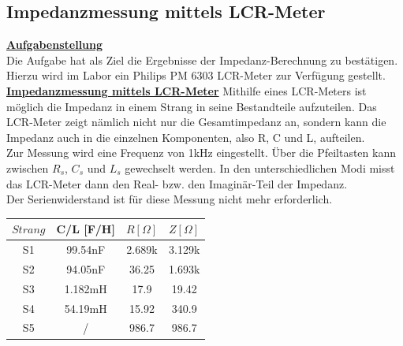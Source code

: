 \documentclass[a4paper,12pt]{article}
\begin{document}
	\subsection{Impedanzmessung mittels LCR-Meter}
	\underline{\textbf{Aufgabenstellung}} \\ \newline
	\noindent
	Die Aufgabe hat als Ziel die Ergebnisse der Impedanz-Berechnung zu bestätigen. Hierzu wird im Labor ein Philips PM 6303 LCR-Meter zur Verfügung gestellt. \\ \newline
	\noindent
	\underline{\textbf{Impedanzmessung mittels LCR-Meter}}
	Mithilfe eines LCR-Meters ist möglich die Impedanz in einem Strang in seine Bestandteile aufzuteilen. Das LCR-Meter zeigt nämlich nicht nur die Gesamtimpedanz an, sondern kann die Impedanz auch in die einzelnen Komponenten, also R, C und L, aufteilen.\\ \newline Zur Messung wird eine Frequenz von 1kHz eingestellt. Über die Pfeiltasten kann zwischen $R_s$, $C_s$ und $L_s$ gewechselt werden. In den unterschiedlichen Modi misst das LCR-Meter dann den Real- bzw. den Imaginär-Teil der Impedanz.\\ \newline
	Der Serienwiderstand ist für diese Messung nicht mehr erforderlich. \newline
	\begin{table}[h]
	\centering
		\begin{tabular}{|c|c|c|c|}
			\hline
			\multicolumn{1}{|l|}{$Strang$} & \multicolumn{1}{l|}{C/L [F/H]} & \multicolumn{1}{l|}{$R [\Omega]$} & \multicolumn{1}{l|}{$Z [\Omega]$} \\ \hline
			S1                             & 99.54nF                            & 2.689k                                             & 3.129k                                             \\ \hline
			S2                             & 94.05nF                            & 36.25                                              & 1.693k                                             \\ \hline
			S3                             & 1.182mH                            & 17.9                                               & 19.42                                              \\ \hline
			S4                             & 54.19mH                            & 15.92                                              & 340.9                                              \\ \hline
			S5                             & /                                  & 986.7                                              & 986.7                                              \\ \hline
		\end{tabular}
	\end{table}\newline
	\newpage
\end{document}
